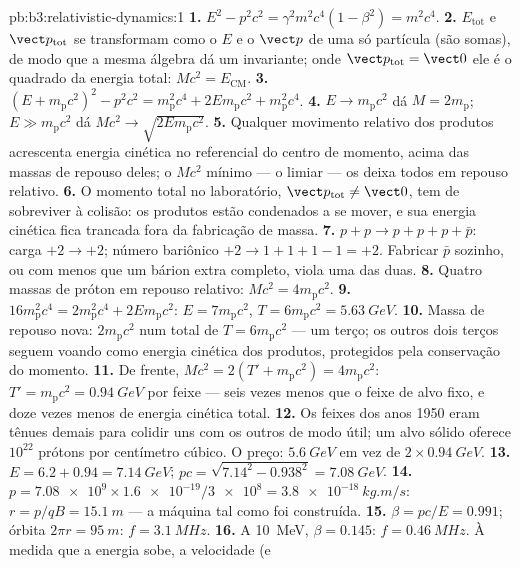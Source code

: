 \begin{solution}{pb:b3:relativistic-dynamics:1}
\textbf{1.} $E^2 - p^2c^2 = \gamma^2m^2c^4(1 - \beta^2) = m^2c^4$.
\textbf{2.} $E_{\text{tot}}$ e $\vect p_{\text{tot}}$ se transformam
como o $E$ e o $\vect p$ de uma só partícula (são somas), de modo que
a mesma álgebra dá um invariante; onde $\vect p_{\text{tot}} = \vect 0$
ele é o quadrado da energia total: $Mc^2 = E_{\text{CM}}$.
\textbf{3.} $(E + m_{\text{p}}c^2)^2 - p^2c^2 = m_{\text{p}}^2c^4 +
2Em_{\text{p}}c^2 + m_{\text{p}}^2c^4$.
\textbf{4.} $E \to m_{\text{p}}c^2$ dá $M = 2m_{\text{p}}$;
$E \gg m_{\text{p}}c^2$ dá $Mc^2 \to \sqrt{2Em_{\text{p}}c^2}$.
\textbf{5.} Qualquer movimento relativo dos produtos acrescenta
energia cinética no referencial do centro de momento, acima das massas
de repouso deles; o $Mc^2$ mínimo --- o limiar --- os deixa todos em
repouso relativo.
\textbf{6.} O momento total no laboratório, $\vect p_{\text{tot}} \neq \vect 0$,
tem de sobreviver à colisão: os produtos estão condenados a se mover, e
sua energia cinética fica trancada fora da fabricação de massa.
\textbf{7.} $p + p \to p + p + p + \bar p$: carga $+2 \to +2$; número
bariônico $+2 \to 1 + 1 + 1 - 1 = +2$. Fabricar $\bar p$ sozinho, ou
com menos que um bárion extra completo, viola uma das duas.
\textbf{8.} Quatro massas de próton em repouso relativo: $Mc^2 =
4m_{\text{p}}c^2$.
\textbf{9.} $16m_{\text{p}}^2c^4 = 2m_{\text{p}}^2c^4 +
2Em_{\text{p}}c^2$: $E = 7m_{\text{p}}c^2$, $T = 6m_{\text{p}}c^2 =
\qty{5.63}{GeV}$.
\textbf{10.} Massa de repouso nova: $2m_{\text{p}}c^2$ num total de $T =
6m_{\text{p}}c^2$ --- um terço; os outros dois terços seguem
voando como energia cinética dos produtos, protegidos pela conservação
do momento.
\textbf{11.} De frente, $Mc^2 = 2(T' + m_{\text{p}}c^2) =
4m_{\text{p}}c^2$: $T' = m_{\text{p}}c^2 = \qty{0.94}{GeV}$ por feixe
--- seis vezes menos que o feixe de alvo fixo, e doze vezes menos de
energia cinética total.
\textbf{12.} Os feixes dos anos 1950 eram tênues demais para colidir
uns com os outros de modo útil; um alvo sólido oferece $10^{22}$
prótons por centímetro cúbico. O preço: $\qty{5.6}{GeV}$ em vez de
$2 \times \qty{0.94}{GeV}$.
\textbf{13.} $E = 6.2 + 0.94 = \qty{7.14}{GeV}$; $pc =
\sqrt{7.14^2 - 0.938^2} = \qty{7.08}{GeV}$.
\textbf{14.} $p = \num{7.08e9} \times \num{1.6e-19}/\num{3e8} =
\qty{3.8e-18}{kg.m/s}$: $r = p/qB = \qty{15.1}{m}$ --- a máquina tal
como foi construída.
\textbf{15.} $\beta = pc/E = 0.991$; órbita $2\pi r = \qty{95}{m}$:
$f = \qty{3.1}{MHz}$.
\textbf{16.} A \qty{10}{MeV}, $\beta = 0.145$: $f =
\qty{0.46}{MHz}$. À medida que a energia sobe, a velocidade (e

\end{solution}

